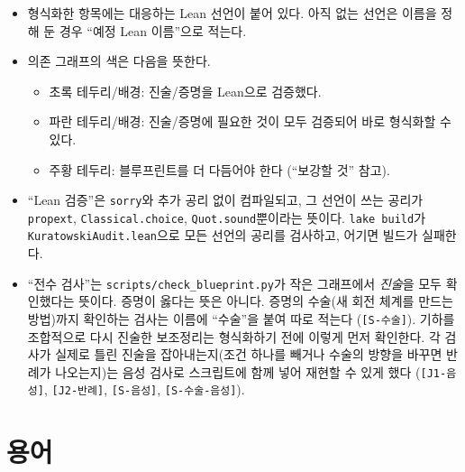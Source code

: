 \begin{itemize}
  \item 형식화한 항목에는 대응하는 Lean 선언이 붙어 있다. 아직 없는 선언은 이름을 정해 둔 경우
        ``예정 Lean 이름''으로 적는다.
  \item 의존 그래프의 색은 다음을 뜻한다.
    \begin{itemize}
      \item 초록 테두리/배경: 진술/증명을 Lean으로 검증했다.
      \item 파란 테두리/배경: 진술/증명에 필요한 것이 모두 검증되어 바로 형식화할 수 있다.
      \item 주황 테두리: 블루프린트를 더 다듬어야 한다 (``보강할 것'' 참고).
    \end{itemize}
  \item ``Lean 검증''은 \texttt{sorry}와 추가 공리 없이 컴파일되고, 그 선언이 쓰는 공리가
        \texttt{propext}, \texttt{Classical.choice}, \texttt{Quot.sound}뿐이라는 뜻이다. \texttt{lake build}가
        \texttt{KuratowskiAudit.lean}으로 모든 선언의 공리를 검사하고, 어기면 빌드가 실패한다.
  \item ``전수 검사''는 \texttt{scripts/check\_blueprint.py}가 작은 그래프에서 \emph{진술}을 모두 확인했다는
        뜻이다. 증명이 옳다는 뜻은 아니다. 증명의 수술(새 회전 체계를 만드는 방법)까지 확인하는 검사는
        이름에 ``수술''을 붙여 따로 적는다 (\texttt{[S-수술]}). 기하를 조합적으로 다시 진술한 보조정리는
        형식화하기 전에 이렇게 먼저 확인한다. 각 검사가 실제로 틀린 진술을 잡아내는지(조건 하나를 빼거나
        수술의 방향을 바꾸면 반례가 나오는지)는 음성 검사로 스크립트에 함께 넣어 재현할 수 있게 했다
        (\texttt{[J1-음성]}, \texttt{[J2-반례]}, \texttt{[S-음성]}, \texttt{[S-수술-음성]}).
\end{itemize}

\section*{용어}

